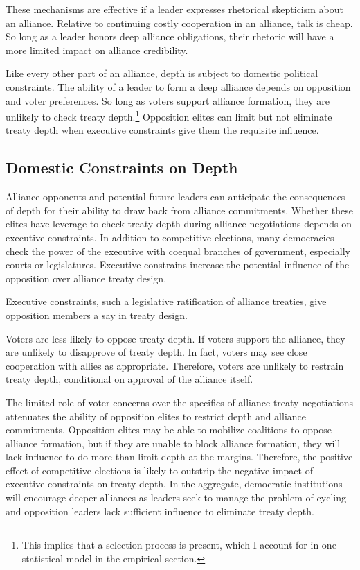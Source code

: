 \documentclass[12pt]{article}
\begin{document}
These mechanisms are effective if a leader expresses rhetorical skepticism about an alliance. 
Relative to continuing costly cooperation in an alliance, talk is cheap. 
So long as a leader honors deep alliance obligations, their rhetoric will have a more limited impact on alliance credibility. 


Like every other part of an alliance, depth is subject to domestic political constraints. 
The ability of a leader to form a deep alliance depends on opposition and voter preferences.
So long as voters support alliance formation, they are unlikely to check treaty depth.\footnote{This implies that a selection process is present, which I account for in one statistical model in the empirical section.} 
Opposition elites can limit but not eliminate treaty depth when executive constraints give them the requisite influence. 


\subsection{Domestic Constraints on Depth} 


Alliance opponents and potential future leaders can anticipate the consequences of depth for their ability to draw back from alliance commitments. 
Whether these elites have leverage to check treaty depth during alliance negotiations depends on executive constraints. 
In addition to competitive elections, many democracies check the power of the executive with coequal branches of government, especially courts or legislatures. 
Executive constrains increase the potential influence of the opposition over alliance treaty design.  


Executive constraints, such a legislative ratification of alliance treaties, give opposition members a say in treaty design. 


Voters are less likely to oppose treaty depth. 
If voters support the alliance, they are unlikely to disapprove of treaty depth.
In fact, voters may see close cooperation with allies as appropriate. 
Therefore, voters are unlikely to restrain treaty depth, conditional on approval of the alliance itself. 


The limited role of voter concerns over the specifics of alliance treaty negotiations attenuates the ability of opposition elites to restrict depth and alliance commitments.
Opposition elites may be able to mobilize coalitions to oppose alliance formation, but if they are unable to block alliance formation, they will lack influence to do more than limit depth at the margins. 
Therefore, the positive effect of competitive elections is likely to outstrip the negative impact of executive constraints on treaty depth.
In the aggregate, democratic institutions will encourage deeper alliances as leaders seek to manage the problem of cycling and opposition leaders lack sufficient influence to eliminate treaty depth.  
\end{document}
